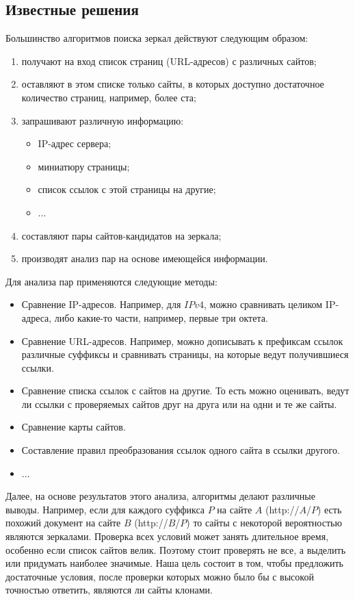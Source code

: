 \subsection{Известные решения}
Большинство алгоритмов поиска зеркал действуют следующим образом:
\begin{enumerate}
\item получают на вход список страниц (URL-адресов) с различных сайтов;
\item оставляют в этом списке только сайты, в которых доступно достаточное
количество страниц, например, более ста;
\item запрашивают различную информацию:
\begin{itemize}
\item IP-адрес сервера;
\item миниатюру страницы;
\item список ссылок с этой страницы на другие;
\item ...
\end{itemize}
\item составляют пары сайтов-кандидатов на зеркала;
\item производят анализ пар на основе имеющейся информации.
\end{enumerate}

Для анализа пар применяются следующие методы:
\begin{itemize}
\item Сравнение IP-адресов. Например, для $IPv4$, можно сравнивать целиком
IP-адреса, либо какие-то части, например, первые три октета.
\item Сравнение URL-адресов. Например, можно дописывать к префиксам ссылок
различные суффиксы и сравнивать страницы, на которые ведут получившиеся ссылки.
\item Сравнение списка ссылок с сайтов на другие. То есть можно оценивать, ведут
ли ссылки с проверяемых сайтов друг на друга или на одни и те же сайты.
\item Сравнение карты сайтов.
\item Составление правил преобразования ссылок одного сайта в ссылки другого. 
\item ...
\end{itemize}

Далее, на основе результатов этого анализа, алгоритмы делают различные выводы.
Например, если для каждого суффикса $P$ на сайте $A$ (http://$A$/$P$) есть похожий
документ на сайте $B$ (http://$B$/$P$) то сайты с некоторой вероятностью являются зеркалами. Проверка всех
условий может занять длительное время, особенно если список сайтов велик.
Поэтому стоит проверять не все, а выделить или придумать наиболее значимые. Наша
цель состоит в том, чтобы предложить достаточные условия, после проверки которых
можно было бы с высокой точностью ответить, являются ли сайты клонами. 
